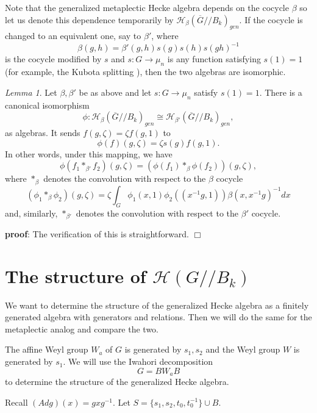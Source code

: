 \documentclass[12pt,letterpaper]{amsart}
\theoremstyle{definition}
\theoremstyle{remark}
\newtheorem{lemma}[theorem]{Lemma}
\begin{document}
Note that the generalized metaplectic Hecke
algebra depends on the cocycle $\beta$
so let us denote this dependence temporarily by
$\mathcal{H}_\beta(\overline{G}//B_k)_{gen}$.
If the cocycle is changed to an equivalent one,
say to $\beta'$, where 
\[
\beta(g,h)=\beta'(g,h)s(g)s(h)s(gh)^{-1}
\]
is the cocycle modified by $s$ 
and $s:G\rightarrow \mu_n$ is any function
satisfying $s(1)=1$
(for example, the Kubota splitting
\cite{KP}), then the two algebras are 
isomorphic.

\begin{lemma} 
\label{lemma:isomorphic}
Let $\beta,\beta'$ be as above and let
$s:G\rightarrow \mu_n$ satisfy $s(1)=1$.
There is a canonical isomorphism
\[
\phi:\mathcal{H}_\beta(\overline{G}//B_k)_{gen}
\cong
\mathcal{H}_{\beta'}(\overline{G}//B_k)_{gen},
\]
as algebras. It sends $f(g,\zeta)=\zeta f(g,1)$ to
\[
\phi(f)(g,\zeta)=\zeta s(g) f(g,1).
\]
In other words, under this mapping, we have
\[
\phi(f_1*_{\beta'} f_2)(g,\zeta)
=(\phi(f_1)*_{\beta}\phi(f_2))(g,\zeta),
\]
where $*_\beta$ denotes the convolution
with respect to the $\beta$ cocycle
\[
(\phi_1*_\beta \phi_2)(g,\zeta)
=\zeta \int_{G}\phi_1(x,1)\phi_2((x^{-1}g,1))
\beta(x,x^{-1}g)^{-1} dx
\]
and, similarly, $*_{\beta'}$ denotes the convolution
with respect to the $\beta'$ cocycle.
\end{lemma}

{\bf proof}: The verification of this
is straightforward.      $\Box$

\section{The structure of $\mathcal{H}(G//B_k)$}
\label{section:sl2}

We want to determine the structure of the generalized Hecke algebra as
a finitely generated algebra with generators and relations.
Then we will do the same for the metaplectic analog and compare the
two.

The affine Weyl group $W_a$ of $G$ is generated by $s_1,s_2$ and
the Weyl group $W$ is generated by $s_1$. We will use the
Iwahori decomposition
\[
G=BW_aB
\]
to determine the structure of the generalized Hecke algebra.

Recall $(Ad g)(x)=gxg^{-1}$. Let $S=\{s_1,s_2,t_0,
t_0^{-1}\}\cup B$.
\end{document}
